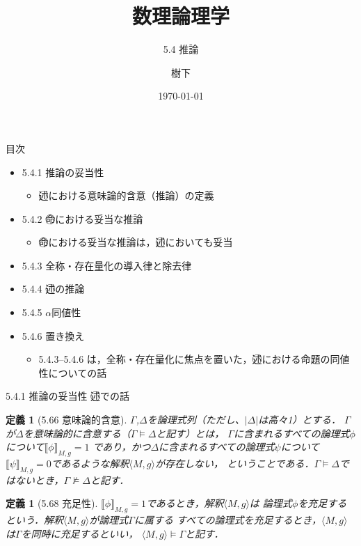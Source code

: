 \documentclass[dvipdfmx,11pt]{beamer}
\title{数理論理学}
\subtitle{5.4 推論}
\author{樹下}
\date{\today}
\newcommand{\predl}{\textcircled{\scriptsize 述}}
\newcommand{\propl}{\textcircled{\scriptsize 命}}
\newtheorem{defi}[theorem]{定義}
\begin{document}
\maketitle

\begin{frame}{目次}
  \begin{itemize}

  \item 5.4.1 推論の妥当性
    \begin{itemize}
    \item \predl{}における意味論的含意（推論）の定義
    \end{itemize}
  \item 5.4.2 \propl{}における妥当な推論
    \begin{itemize}
    \item \propl{}における妥当な推論は，\predl{}においても妥当
    \end{itemize}

  \item 5.4.3 全称・存在量化の導入律と除去律
  \item 5.4.4 \predl{}の推論
  \item 5.4.5 \(\alpha\)同値性
  \item 5.4.6 置き換え

    \begin{itemize}
    \item 5.4.3--5.4.6 は，全称・存在量化に焦点を置いた，\predl{}における命題の同値性についての話
    \end{itemize}

  \end{itemize}
\end{frame}

\begin{frame}{5.4.1 推論の妥当性}
  \predl{}での話

  \begin{defi}[5.66 意味論的含意]
    \(\Gamma\),\(\Delta\)を論理式列（ただし、\(\left|\Delta\right|\)は高々1）とする．
    \(\Gamma\)が\(\Delta\)を意味論的に含意する（\(\Gamma\vDash\Delta\)と記す）とは，
    \(\Gamma\)に含まれるすべての論理式\(\phi\)について\(\llbracket\phi\rrbracket_{M,g}=1\)
    であり，かつ\(\Delta\)に含まれるすべての論理式\(\psi\)について
    \(\llbracket\psi\rrbracket_{M,g}=0\)であるような解釈\(\langle M,g\rangle\)が存在しない，
    ということである．\(\Gamma\vDash\Delta\)ではないとき，\(\Gamma\nvDash\Delta\)と記す．
  \end{defi}

  \begin{defi}[5.68 充足性]
    \(\llbracket\phi\rrbracket_{M,g}=1\)であるとき，解釈\(\langle M,g \rangle\)は
    論理式\(\phi\)を充足するという．解釈\(\langle M,g \rangle\)が論理式\(\Gamma\)に属する
    すべての論理式を充足するとき，\(\langle M,g \rangle\)は\(\Gamma\)を同時に充足するといい，
    \(\langle M,g \rangle\vDash\Gamma\)と記す．
  \end{defi}
\end{frame}
\end{document}

